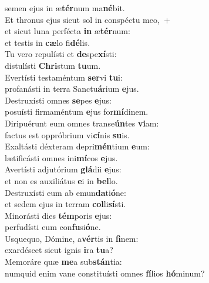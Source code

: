 \oddverse semen ejus in æ\textbf{tér}num ma\textbf{né}bit.\\
\evenverse Et thronus ejus sicut sol in conspéctu meo,~+\\
\evenverse  et sicut luna perfécta \textbf{in} æ\textbf{tér}num:~\*\\
\evenverse et testis in \textbf{cæ}lo fi\textbf{dé}lis.\\
\oddverse Tu vero repulísti et \textbf{de}spe\textbf{xí}sti:~\*\\
\oddverse distulísti \textbf{Chri}stum \textbf{tu}um.\\
\evenverse Evertísti testaméntum \textbf{ser}vi \textbf{tu}i:~\*\\
\evenverse profanásti in terra Sanctu\textbf{á}rium \textbf{e}jus.\\
\oddverse Destruxísti omnes \textbf{se}pes \textbf{e}jus:~\*\\
\oddverse posuísti firmaméntum \textbf{e}jus for\textbf{mí}dinem.\\
\evenverse Diripuérunt eum omnes transe\textbf{ún}tes \textbf{vi}am:~\*\\
\evenverse factus est oppróbrium vi\textbf{cí}nis \textbf{su}is.\\
\oddverse Exaltásti déxteram depri\textbf{mén}tium \textbf{e}um:~\*\\
\oddverse lætificásti omnes ini\textbf{mí}cos \textbf{e}jus.\\
\evenverse Avertísti adjutórium \textbf{glá}dii \textbf{e}jus:~\*\\
\evenverse et non es auxiliátus \textbf{e}i in \textbf{bel}lo.\\
\oddverse Destruxísti eum ab emun\textbf{da}ti\textbf{ó}ne:~\*\\
\oddverse et sedem ejus in terram \textbf{col}li\textbf{sí}sti.\\
\evenverse Minorásti dies \textbf{tém}poris \textbf{e}jus:~\*\\
\evenverse perfudísti eum con\textbf{fu}si\textbf{ó}ne.\\
\oddverse Usquequo, Dómine, a\textbf{vér}tis in \textbf{fi}nem:~\*\\
\oddverse exardéscet sicut ignis \textbf{i}ra \textbf{tu}a?\\
\evenverse Memoráre quæ \textbf{me}a sub\textbf{stán}tia:~\*\\
\evenverse numquid enim vane constituísti omnes \textbf{fí}lios \textbf{hó}minum?\\

